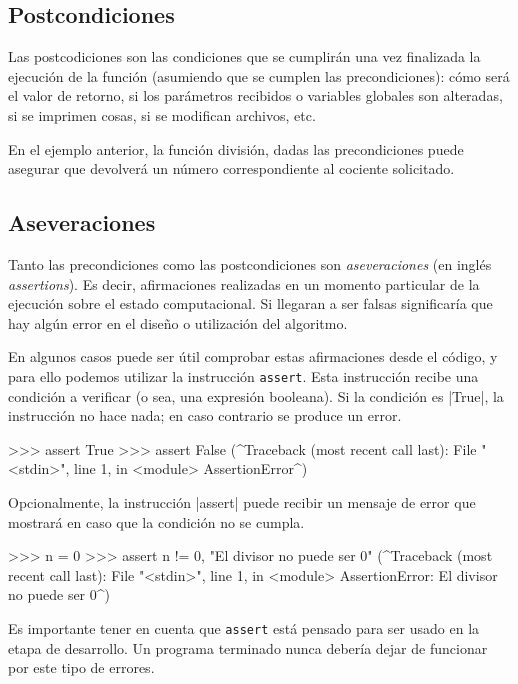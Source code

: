 \subsection{Postcondiciones}

Las postcodiciones son las condiciones que se cumplirán una vez finalizada la
ejecución de la función (asumiendo que se cumplen las precondiciones): cómo
será el valor de retorno, si los parámetros recibidos o variables globales son
alteradas, si se imprimen cosas, si se modifican archivos, etc.

En el ejemplo anterior, la función división, dadas las precondiciones
puede asegurar que devolverá un número correspondiente al cociente solicitado.

\subsection{Aseveraciones}

Tanto las precondiciones como las postcondiciones son \textit{aseveraciones}
(en inglés \textit{assertions}). Es decir, afirmaciones realizadas en un momento
particular de la ejecución sobre el estado computacional. Si llegaran a ser
falsas significaría que hay algún error en el diseño o utilización del algoritmo.

En algunos casos puede ser útil comprobar estas afirmaciones desde el código, y
para ello podemos utilizar la instrucción \lstinline!assert!. Esta instrucción
recibe una condición a verificar (o sea, una expresión booleana).
Si la condición es |True|, la instrucción no hace nada; en caso contrario se
produce un error.

\begin{codigo-python-sn}
>>> assert True
>>> assert False
(^Traceback (most recent call last):
  File "<stdin>", line 1, in <module>
AssertionError^)
\end{codigo-python-sn}

Opcionalmente, la instrucción |assert| puede recibir
un mensaje de error que mostrará en caso que la condición no se cumpla.

\begin{codigo-python-sn}
>>> n = 0
>>> assert n != 0, "El divisor no puede ser 0"
(^Traceback (most recent call last):
  File "<stdin>", line 1, in <module>
AssertionError: El divisor no puede ser 0^)
\end{codigo-python-sn}

\begin{atencion}
Es importante tener en cuenta que \lstinline!assert! está pensado para ser
usado en la etapa de desarrollo. Un programa terminado nunca debería dejar
de funcionar por este tipo de errores.
\end{atencion}


